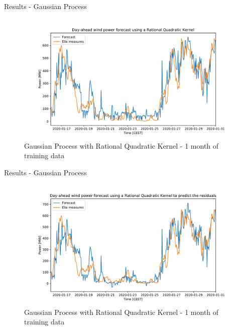 \documentclass[12pt]{beamer}
\begin{document}
\begin{frame}{Results - Gaussian Process}
    \begin{figure}
        \centering
        \includegraphics[width=\textwidth]{resources/pdf/dawpf_rqk_1a.pdf}
        \caption{Gaussian Process with Rational Quadratic Kernel - 1 month of training data}
    \end{figure}
\end{frame}

\begin{frame}{Results - Gaussian Process}
    \begin{figure}
        \centering
        \includegraphics[width=\textwidth]{resources/pdf/dawpf_rqk_r_1a.pdf}
        \caption{Gaussian Process with Rational Quadratic Kernel - 1 month of training data}
    \end{figure}
\end{frame}
\end{document}
